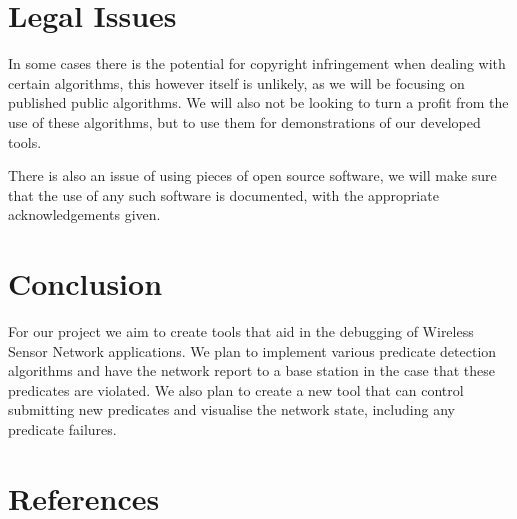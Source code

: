 \documentclass[a4paper]{article}
\begin{document}
\section{Legal Issues}
In some cases there is the potential for copyright infringement when dealing with certain algorithms, this however itself is unlikely, as we will be focusing on published public algorithms. We will also not be looking to turn a profit from the use of these algorithms, but to use them for demonstrations of our developed tools.

There is also an issue of using pieces of open source software, we will make sure that the use of any such software is documented, with the appropriate acknowledgements given.

\section{Conclusion}

For our project we aim to create tools that aid in the debugging of Wireless Sensor Network applications. We plan to implement various predicate detection algorithms and have the network report to a base station in the case that these predicates are violated. We also plan to create a new tool that can control submitting new predicates and visualise the network state, including any predicate failures.

\clearpage

\appendixpage
\addappheadtotoc
\appendix


\section{References}
\renewcommand{\refname}{\vspace{-1cm}}


\end{document}
